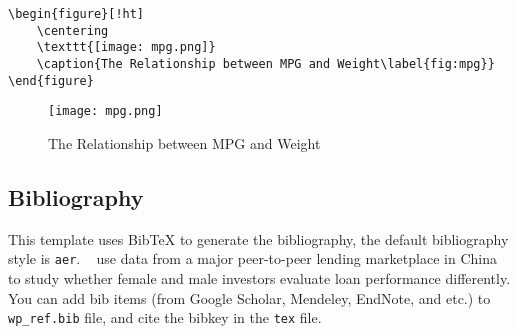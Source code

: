 \documentclass{elegantpaper}
\begin{document}
\begin{Verbatim}[tabsize=4,frame=single,baselinestretch=1]
\begin{figure}[!ht]
	\centering
	\texttt{[image: mpg.png]}
	\caption{The Relationship between MPG and Weight\label{fig:mpg}}
\end{figure}
\end{Verbatim}
\begin{figure}[!ht]
	\centering
	\texttt{[image: mpg.png]}
	\caption{The Relationship between MPG and Weight\label{fig:mpg}}
\end{figure}

\subsection{Bibliography}
This template uses Bib\TeX{} to generate the bibliography, the default bibliography style is \verb|aer|. ~\cite{Chen2018} use data from a major peer-to-peer lending marketplace in China to study whether female and male investors evaluate loan performance differently. You can add bib items (from Google Scholar, Mendeley, EndNote, and etc.) to \verb|wp_ref.bib| file, and cite the bibkey in the \verb|tex| file.


\nocite{EINAV2010,Havrylchyk2018} 



\end{document}
